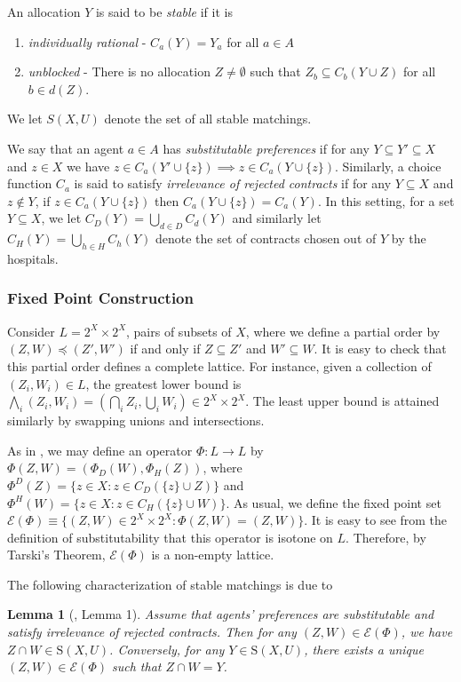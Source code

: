 \documentclass[11pt,reqno]{amsart}
\newtheorem{lemma}[thm]{Lemma}
\theoremstyle{definition}
\numberwithin{equation}{section}
\newcommand{\lft}{\left(}
\newcommand{\rt}{\right)}
\newcommand{\sub}{\subseteq}
\newcommand{\stable}{\mathrm{S}(X,U)}
\newcommand{\fix}{\mathcal{E}}
\newcommand{\peq}{\preceq}
\newcommand{\lattice}{L}
\begin{document}
An allocation $Y$ is said to be \emph{stable} if it is 
\begin{enumerate}
\item \emph{individually rational} - $C_a(Y) = Y_a$ for all $a \in A$
\item \emph{unblocked} - There is no allocation $Z \not = \emptyset$ such that $Z_b \sub C_b(Y\cup Z)$ for all $b \in d(Z)$. 
\end{enumerate}
We let $S(X,U)$ denote the set of all stable matchings.

We say that an agent $a \in A$ has \emph{substitutable preferences} if for any $Y \sub Y' \sub X$ and $z \in X$ we have $z \in C_a(Y' \cup \{ z \}) \implies z \in C_a(Y \cup \{z \})$. 
Similarly, a choice function $C_a$ is said to satisfy \emph{irrelevance of rejected contracts} if for any $Y \sub X$ and $z \not \in Y$, if $z \in C_a(Y \cup \{ z \})$ then $C_a(Y \cup \{z\}) = C_a(Y)$.
In this setting, for a set $Y \sub X$, we let $C_D(Y) = \bigcup_{d \in D} C_d(Y)$ and similarly let $C_H(Y) = \bigcup_{h \in H} C_h(Y)$ denote the set of contracts chosen out of $Y$ by the hospitals.

\subsubsection{Fixed Point Construction}
Consider $\lattice = 2^X \times 2^X$, pairs of subsets of $X$, where we define a partial order by $(Z,W) \peq (Z',W')$ if and only if $Z \sub Z'$ and $W' \sub W$. 
It is easy to check that this partial order defines a complete lattice.
For instance, given a collection of $(Z_i, W_i) \in \lattice$, the greatest lower bound is $\bigwedge_i (Z_i, W_i) = \lft \bigcap_i Z_i, \bigcup_i W_i \rt \in 2^X \times 2^X$.
The least upper bound is attained similarly by swapping unions and intersections. 

As in \cite{HatfieldKominers2010b}, we may define an operator $\Phi: \lattice \to \lattice$ by $\Phi(Z,W) = (\Phi_D(W), \Phi_H(Z))$, where $\Phi^D(Z) = \{z \in X: z \in C_D(\{z \} \cup Z) \}$ and $\Phi^H(W) = \{z \in X: z \in C_H(\{z \} \cup W) \}$.
As usual, we define the fixed point set $\fix(\Phi) \equiv \{(Z,W) \in 2^X \times 2^X: \Phi(Z,W) = (Z,W) \}$.
It is easy to see from the definition of substitutability that this operator is isotone on $\lattice$.
Therefore, by Tarski's Theorem, $\fix(\Phi)$ is a non-empty lattice.

The following characterization of stable matchings is due to \cite{HatfieldKominers2010b} 
\begin{lemma}[\cite{HatfieldKominers2010b}, Lemma 1] \label{lemma:hk}
Assume that agents' preferences are substitutable and satisfy irrelevance of rejected contracts.
Then for any $(Z,W) \in \fix(\Phi)$, we have $Z\cap W \in \stable$.
Conversely, for any $Y\in \stable$, there exists a unique $(Z,W) \in \fix(\Phi)$ such that $Z \cap W = Y$.
\end{lemma}
\end{document}
